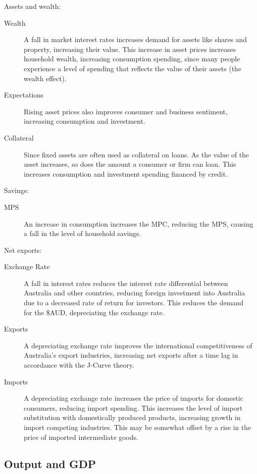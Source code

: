 \documentclass[a4paper,11pt]{report}
\begin{document}
Assets and wealth:

\begin{description}
\item [Wealth] A fall in market interest rates increases demand for assets like
	shares and property, increasing their value. This increase in asset prices
	increases household wealth, increasing consumption spending, since many
	people experience a level of spending that reflects the value of their
	assets (the wealth effect).
\item [Expectations] Rising asset prices also improves consumer and business
	sentiment, increasing consumption and investment.
\item [Collateral] Since fixed assets are often used as collateral on loans.
	As the value of the asset increases, so does the amount a consumer or firm
	can loan. This increases consumption and investment spending financed by
	credit.
\end{description}

Savings:

\begin{description}
\item [MPS] An increase in consumption increases the MPC, reducing the MPS,
	causing a fall in the level of household savings.
\end{description}

Net exports:

\begin{description}
\item [Exchange Rate] A fall in interest rates reduces the interest rate
	differential between Australia and other countries, reducing foreign
	investment into Australia due to a decreased rate of return for investors.
	This reduces the demand for the \$AUD, depreciating the exchange rate.
\item [Exports] A depreciating exchange rate improves the international
	competitiveness of Australia's export industries, increasing net exports
	after a time lag in accordance with the J-Curve theory.
\item [Imports] A depreciating exchange rate increases the price of imports for
	domestic consumers, reducing import spending. This increases the level of
	import substitution with domestically produced products, increasing growth
	in import competing industries. This may be somewhat offset by a rise in
	the price of imported intermediate goods.
\end{description}

\subsection{Output and GDP}
\end{document}
